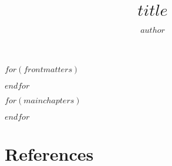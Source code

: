 \documentclass[nemilov1]{Nemilov}
\begin{document}
\frontmatter



\title{$title$}


\author{$author$}

\maketitle

\setcounter{page}{5}


\tableofcontents

$for(frontmatters)$

$endfor$


\mainmatter


$for(mainchapters)$

$endfor$

%
%

\appendix

%

\cleardoublepage

\chapter*{References}



\cleardoublepage
\printindex
\cleardoublepage


\clearpage
\end{document}
